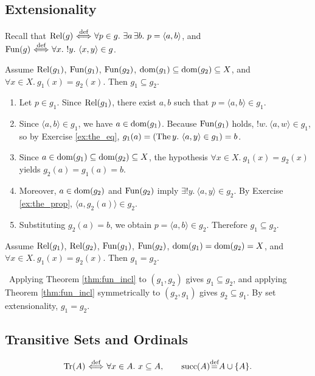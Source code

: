 \documentclass[10pt,a4paper]{article}
\begin{document}
\subsection{Extensionality}\label{sec:extensionality}
Recall that ${\textrm{Rel}}(g) {\stackrel{{\textrm{def}}}{\ \Longleftrightarrow\ }} \forall p \in g.\ \exists a\, \exists b.\ p = \langle a,b\rangle$, and ${\textrm{Fun}}(g) {\stackrel{{\textrm{def}}}{\ \Longleftrightarrow\ }} \forall x.\ !y.\ \langle x,y\rangle \in g$.

\begin{theorem}\label{thm:fun_incl}
Assume ${\textrm{Rel}}(g_1)$, ${\textrm{Fun}}(g_1)$, ${\textrm{Fun}}(g_2)$, ${\textrm{dom}}(g_1)\subseteq{\textrm{dom}}(g_2)\subseteq X$, and $\forall x\in X.\ g_1(x)=g_2(x)$. Then $g_1\subseteq g_2$.
\end{theorem}
\myprf
\begin{enumerate}
\item Let $p \in g_1$. Since ${\textrm{Rel}}(g_1)$, there exist $a, b$ such that $p = \langle a, b\rangle \in g_1$.
\item Since $\langle a, b\rangle \in g_1$, we have $a \in {\textrm{dom}}(g_1)$. Because ${\textrm{Fun}}(g_1)$ holds, $!w.\ \langle a,w\rangle \in g_1$, so by Exercise \ref{ex:the_eq}, $g_1(a) = ({\textrm{The\,}} y.\ \langle a,y\rangle \in g_1) = b$.
\item Since $a \in {\textrm{dom}}(g_1) \subseteq {\textrm{dom}}(g_2) \subseteq X$, the hypothesis $\forall x \in X.\ g_1(x) = g_2(x)$ yields $g_2(a) = g_1(a) = b$.
\item Moreover, $a \in {\textrm{dom}}(g_2)$ and ${\textrm{Fun}}(g_2)$ imply $\exists !y.\ \langle a,y\rangle \in g_2$. By Exercise \ref{ex:the_prop}, $\langle a, g_2(a)\rangle \in g_2$.
\item Substituting $g_2(a) = b$, we obtain $p = \langle a, b\rangle \in g_2$. Therefore $g_1 \subseteq g_2$.
\end{enumerate}
\myqed

\begin{theorem}\label{thm:fun_ext}
Assume ${\textrm{Rel}}(g_1)$, ${\textrm{Rel}}(g_2)$, ${\textrm{Fun}}(g_1)$, ${\textrm{Fun}}(g_2)$, ${\textrm{dom}}(g_1) = {\textrm{dom}}(g_2) = X$, and $\forall x\in X.\ g_1(x)=g_2(x)$. Then $g_1 = g_2$.
\end{theorem}
\myprf\ Applying Theorem \ref{thm:fun_incl} to $(g_1, g_2)$ gives $g_1 \subseteq g_2$, and applying Theorem \ref{thm:fun_incl} symmetrically to $(g_2, g_1)$ gives $g_2 \subseteq g_1$. By set extensionality, $g_1 = g_2$. \myqed
\subsection{Transitive Sets and Ordinals}
\begin{definition}
$$\Tr(A) \propdef \forall x\in A.\ x\subseteq A, \qquad \mysucc(A) \eqdef A \cup \{A\}.$$
\end{definition}
\end{document}
